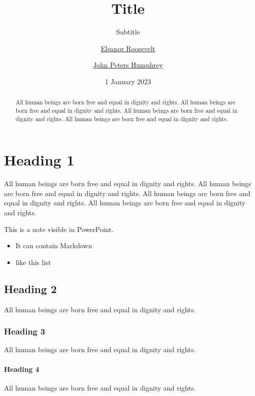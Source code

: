 \documentclass[
]{beamer}
\title{Title}
\subtitle{Subtitle}
\author{\href{eleanor.eoosevelt@domain.com}{Eleanor
Roosevelt} \and \href{jph@domain.com}{John Peters Humphrey}}
\date{1 January 2023}
\providecommand{\tightlist}{%
  \setlength{\itemsep}{0pt}\setlength{\parskip}{0pt}}
\begin{document}
\maketitle
\begin{abstract}
All human beings are born free and equal in dignity and rights. All
human beings are born free and equal in dignity and rights. All human
beings are born free and equal in dignity and rights. All human beings
are born free and equal in dignity and rights.
\end{abstract}

{
\setcounter{tocdepth}{3}
\tableofcontents
}
\hypertarget{heading-1}{%
\section{Heading 1}\label{heading-1}}

All human beings are born free and equal in dignity and rights. All
human beings are born free and equal in dignity and rights. All human
beings are born free and equal in dignity and rights. All human beings
are born free and equal in dignity and rights.

This is a note visible in PowerPoint.

\begin{itemize}
\tightlist
\item
  It can contain Markdown
\item
  like this list
\end{itemize}

\hypertarget{heading-2}{%
\subsection{Heading 2}\label{heading-2}}

All human beings are born free and equal in dignity and rights.

\hypertarget{heading-3}{%
\subsubsection{Heading 3}\label{heading-3}}

All human beings are born free and equal in dignity and rights.

\hypertarget{heading-4}{%
\paragraph{Heading 4}\label{heading-4}}

All human beings are born free and equal in dignity and rights.
\end{document}
